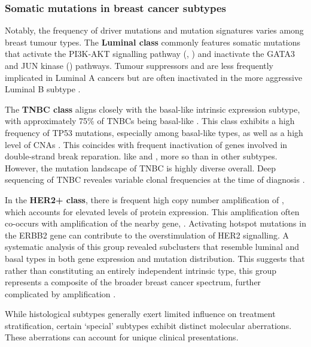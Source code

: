 \subsubsection*{Somatic mutations in breast cancer subtypes}

Notably, the frequency of driver mutations and mutation signatures varies among breast tumour types. The \textbf{Luminal class} commonly features somatic mutations that activate the PI3K-AKT signalling pathway (, ) and inactivate the GATA3 and JUN kinase () pathways. Tumour suppressors  and  are less frequently implicated in Luminal A cancers but are often inactivated in the more aggressive Luminal B subtype \parencite{Cancer_Genome_Atlas_Network2012-gx}.

The \textbf{\ac{TNBC} class} aligns closely with the basal-like intrinsic expression subtype, with approximately 75\% of \ac{TNBC}s being basal-like \parencite{Shah2012-xz}. This class exhibits a high frequency of TP53 mutations, especially among basal-like types, as well as a high level of \ac{CNA}s \parencite{Shah2012-xz, Cancer_Genome_Atlas_Network2012-gx}. This coincides with frequent inactivation of genes involved in double-strand break reparation. like  and , more so than in other subtypes. However, the mutation landscape of \ac{TNBC} is highly diverse overall. Deep sequencing of \ac{TNBC} reveales variable clonal frequencies at the time of diagnosis \parencite{Shah2012-xz}.

In the \textbf{HER2+ class}, there is frequent high copy number amplification of , which accounts for elevated levels of  protein expression. This amplification often co-occurs with amplification of the nearby gene, . Activating hotspot mutations in the ERBB2 gene can contribute to the overstimulation of HER2 signalling. A systematic analysis of this group revealed subclusters that resemble luminal and basal types in both gene expression and mutation distribution. This suggests that rather than constituting an entirely independent intrinsic type, this group represents a composite of the broader breast cancer spectrum, further complicated by  amplification \parencite{Ferrari2016-qj}.

While histological subtypes generally exert limited influence on treatment stratification, certain `special' subtypes exhibit distinct molecular aberrations. These aberrations can account for unique clinical presentations.

